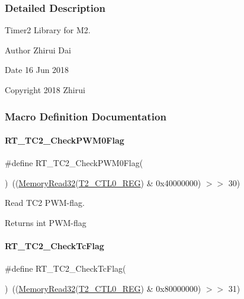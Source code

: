 \subsubsection{Detailed Description}
Timer2 Library for M2. 

\begin{DoxyAuthor}{Author}
Zhirui Dai 
\end{DoxyAuthor}
\begin{DoxyDate}{Date}
16 Jun 2018 
\end{DoxyDate}
\begin{DoxyCopyright}{Copyright}
2018 Zhirui 
\end{DoxyCopyright}


\subsubsection{Macro Definition Documentation}
\mbox{\label{a00083_a68bc636dca2736a8368cfd72ca9eb11a}} 
\paragraph{\texorpdfstring{R\+T\+\_\+\+T\+C2\+\_\+\+Check\+P\+W\+M0\+Flag}{RT\_TC2\_CheckPWM0Flag}}
{\footnotesize\ttfamily \#define R\+T\+\_\+\+T\+C2\+\_\+\+Check\+P\+W\+M0\+Flag(\begin{DoxyParamCaption}{ }\end{DoxyParamCaption})~((\mbox{\hyperlink{a00026_a2d484dc15bdf30ee11ab3b05f31f0e16}{Memory\+Read32}}(\mbox{\hyperlink{a00026_a5853553391e986211306d4f29ab31e47}{T2\+\_\+\+C\+T\+L0\+\_\+\+R\+EG}}) \& 0x40000000) $>$$>$ 30)}



Read T\+C2 P\+W\+M-\/flag. 

\begin{DoxyReturn}{Returns}
int P\+W\+M-\/flag 
\end{DoxyReturn}
\mbox{\label{a00083_ab9c273f7aaa4570b2a179b6711a50741}} 
\paragraph{\texorpdfstring{R\+T\+\_\+\+T\+C2\+\_\+\+Check\+Tc\+Flag}{RT\_TC2\_CheckTcFlag}}
{\footnotesize\ttfamily \#define R\+T\+\_\+\+T\+C2\+\_\+\+Check\+Tc\+Flag(\begin{DoxyParamCaption}{ }\end{DoxyParamCaption})~((\mbox{\hyperlink{a00026_a2d484dc15bdf30ee11ab3b05f31f0e16}{Memory\+Read32}}(\mbox{\hyperlink{a00026_a5853553391e986211306d4f29ab31e47}{T2\+\_\+\+C\+T\+L0\+\_\+\+R\+EG}}) \& 0x80000000) $>$$>$ 31)}



